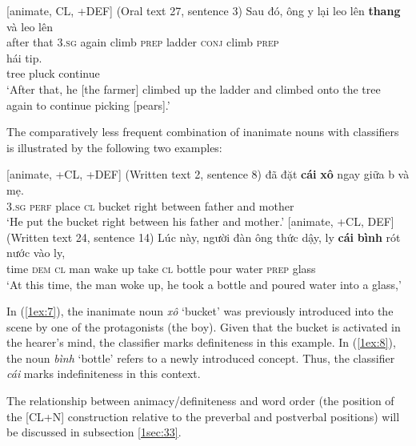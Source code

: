 \documentclass[output=paper]{langsci/langscibook}
\begin{document}
\begin{exe}
\ex\label{1ex:6}
[\minus animate, \minus CL, +DEF] (Oral text 27, sentence 3)
\exi{}
\gll Sau    đó,  {ông {\daa}y}  lại     leo     lên       {\textbf{thang}}   và       leo     lên       \\
after that  3.{\textsc{sg}}     again climb {\textsc{prep}} ladder   {\textsc{conj}} climb {\textsc{prep}}  \\
\glt
\exi{}
  hái     ti{\dae}p. \\
tree  pluck continue \\
\glt `After that, he [the farmer] climbed up the ladder and climbed onto the tree again to continue picking [pears].'
\end{exe}

The comparatively less frequent combination of inanimate nouns with classifiers is illustrated by the following two examples:

\begin{exe}
\ex\label{1ex:7}
[\minus animate, +CL, +DEF] (Written text 2, sentence 8)
\exi{}
  đã     đặt   {\textbf{cái}}  {\textbf{xô}}      ngay  giữa   b{\dao}    và   mẹ.  \\
3.{\textsc{sg}}   {\textsc{perf}}  place  {\textsc{cl}}  bucket  right  between father and  mother  \\
\glt `He put the bucket right between his father and mother.'
\ex\label{1ex:8}
[\minus animate, +CL, \minus DEF] (Written text 24, sentence 14)
\exi{}
\gll Lúc  này,   người {đàn ông} thức  dậy, l{\daa}y  {\textbf{cái}}  {\textbf{bình}}  rót     nước  vào      ly, \\
time {\textsc{dem}} {\textsc{cl}}     man       wake up   take {\textsc{cl}} bottle pour  water {\textsc{prep}}  glass \\
\glt `At this time, the man woke up, he took a bottle and poured water into a glass,'
\end{exe}

In (\ref{1ex:7}), the inanimate noun {\emph{xô}} `bucket' was previously introduced into the scene by one of the protagonists (the boy). Given that the bucket is activated in the hearer's mind, the classifier marks definiteness in this example. In (\ref{1ex:8}), the noun {\emph{bình}} `bottle' refers to a newly introduced concept. Thus, the classifier {\emph{cái}} marks indefiniteness in this context.

The relationship between animacy/definiteness and word order (the position of the [CL+N] construction relative to the preverbal and postverbal positions) will be discussed in subsection \ref{1sec:33}.
\end{document}

